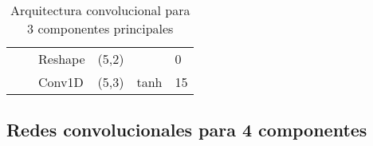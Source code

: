 \begin{table}[H]
\begin{center}
\begin{tabular}{ll|l|l|l|l|}
\multicolumn{1}{|l|}{}                                                                  &                                   & Reshape                            & (5,2)                                &                                          & 0                                           \\ \cline{3-6} 
\multicolumn{1}{|l|}{}                                                                  &                                   & Conv1D                             & (5,3)                                & tanh                                     & 15                                          \\ \hline
\end{tabular}

\end{center}
\caption{Arquitectura convolucional para 3 componentes principales}
\label{table:cnn_3}
\end{table}


\subsection{Redes convolucionales para 4 componentes}

